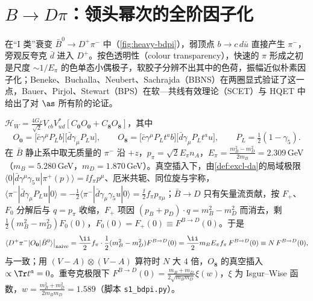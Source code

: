 \section{$B\to D\pi$：领头幂次的全阶因子化}\label{sec:heavy-bdpi}

在“I 类”衰变 $\bar B^0\to D^+\pi^-$ 中（\cref{fig:heavy-bdpi}），弱顶点 $b\to c\,d\bar u$ 直接产生 $\pi^-$，旁观反夸克 $\bar d$ 进入 $D^+$。按色透明性（colour transparency）\cite{Bjorken:1988kk}，快速的 $\pi$ 形成之初是尺度 $\sim1/E_\pi$ 的色单态小偶极子，软胶子分辨不出其中的色荷，振幅近似朴素因子化\cite{Dugan:1990de,Politzer:1991au}；Beneke、Buchalla、Neubert、Sachrajda（BBNS）在两圈显式验证了这一点\cite{BenekeEtAl2000}，Bauer、Pirjol、Stewart（BPS）在软—共线有效理论（SCET）与 HQET 中给出了对 $\as$ 所有阶的论证\cite{BauerPirjolStewart2001}。


\begin{example}[朴素因子化与归一化 $N$]\label{ex:heavy-naive}
$\mathcal H_W=\frac{4G_F}{\sqrt2}V_{cb}V_{ud}^*[C_{\mathbf 0}O_{\mathbf 0}+C_{\mathbf 8}O_{\mathbf 8}]$，其中\cite[式~(2)]{BauerPirjolStewart2001}
\begin{equation}\label{eq:heavy-O08}
O_{\mathbf 0}=\big[\bar c\gamma^\mu P_Lb\big]\big[\bar d\gamma_\mu P_Lu\big],\qquad
O_{\mathbf 8}=\big[\bar c\gamma^\mu P_Lt^ab\big]\big[\bar d\gamma_\mu P_Lt^au\big],\qquad P_L=\tfrac12(1-\gamma_5).
\end{equation}
在 $\bar B$ 静止系中取无质量的 $\pi^-$ 沿 $+z$，$p_\pi=\sqrt2E_\pi n_A$，$E_\pi=\frac{m_B^2-m_D^2}{2m_B}=2.309$\,GeV（$m_B=5.280$\,GeV，$m_D=1.870$\,GeV\cite{ParticleDataGroup:2024cfk}）。真空插入下，由\cref{def:excl-da}的局域极限 $\langle0|\bar d\gamma^\mu\gamma_5u|\pi^+(p)\rangle=\ii f_\pi p^\mu$、厄米共轭、同位旋与宇称，$\langle\pi^-|\bar d\gamma_\mu P_Lu|0\rangle=-\frac12\langle\pi^-|\bar d\gamma_\mu\gamma_5u|0\rangle=\frac{\ii}{2}f_\pi p_{\pi\mu}$；$\bar B\to D$ 只有矢量流贡献，按 $F_+$、$F_0$ 分解后与 $q=p_\pi$ 收缩，$F_+$ 项因 $(p_B+p_D)\cdot q=m_B^2-m_D^2$ 而消去，剩 $\frac12(m_B^2-m_D^2)F_0(0)$，$F_0(0)=F_+(0)\equiv F^{B\to D}(0)$。于是
\begin{equation}\label{eq:heavy-naive}
\langle D^+\pi^-|O_{\mathbf 0}|\bar B^0\rangle\big|_{\rm naive}=\frac{\ii}{2}f_\pi\cdot\frac12(m_B^2-m_D^2)F^{B\to D}(0)=\frac{\ii}{2}m_BE_\pi f_\pi\,F^{B\to D}(0)\equiv N\,F^{B\to D}(0),
\end{equation}
与\cite[式~(8)]{BauerPirjolStewart2001}一致；用 $(V-A)\otimes(V-A)$ 算符时 $N$ 大 $4$ 倍，$O_{\mathbf 8}$ 的真空插入 $\propto\Tr t^a=0$。重夸克极限下 $F^{B\to D}(0)=\frac{m_B+m_D}{2\sqrt{m_Bm_D}}\xi(w)$，$\xi$ 为 Isgur--Wise 函数，$w=\frac{m_B^2+m_D^2}{2m_Bm_D}=1.589$（脚本 \texttt{s1\_\allowbreak bdpi.py}）。
\end{example}

